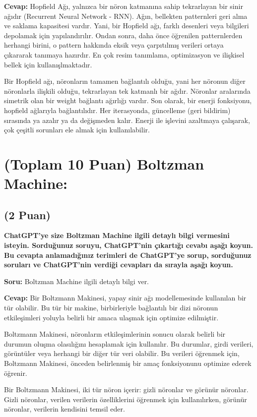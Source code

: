 \documentclass[11pt]{article}
\begin{document}
\textbf{Cevap:} Hopfield Ağı, yalnızca bir nöron katmanına sahip tekrarlayan bir sinir ağıdır (Recurrent Neural Network - RNN). Ağın, bellekten patternleri geri alma ve saklama kapasitesi vardır. Yani, bir Hopfield ağı, farklı desenleri veya bilgileri depolamak için yapılandırılır. Ondan sonra, daha önce öğrenilen patternlerden herhangi birini, o pattern hakkında eksik veya çarpıtılmış verileri ortaya çıkararak tanımaya hazırdır. En çok resim tanımlama, optimizasyon ve ilişkisel bellek için kullanışlmaktadır.

Bir Hopfield ağı, nöronların tamamen bağlantılı olduğu, yani her nöronun diğer nöronlarla ilişkili olduğu, tekrarlayan tek katmanlı bir ağdır. Nöronlar aralarında simetrik olan bir weight bağlantı ağırlığı vardır. Son olarak, bir enerji fonksiyonu, hopfield ağlarıyla bağlantılıdır. Her iterasyonda, güncelleme (geri bildirim) sırasında ya azalır ya da değişmeden kalır.
Enerji ile işlevini azaltmaya çalışarak, çok çeşitli sorunları ele almak için kullanılabilir. 

\section{(Toplam 10 Puan) Boltzman Machine:}

\subsection{(2 Puan)} \textbf{ChatGPT’ye size Boltzman Machine ilgili detaylı bilgi vermesini isteyin. Sorduğunuz soruyu, ChatGPT'nin çıkartığı cevabı aşağı koyun. Bu cevapta anlamadığınız terimleri de ChatGPT’ye sorup, sorduğunuz soruları ve ChatGPT’nin verdiği cevapları da sırayla aşağı koyun.}

 \textbf{Soru:} Boltzman Machine ilgili detaylı bilgi ver.

 \textbf{Cevap:} Bir Boltzmann Makinesi, yapay sinir ağı modellemesinde kullanılan bir tür olabilir. Bu tür bir makine, birbirleriyle bağlantılı bir dizi nöronun etkileşimleri yoluyla belirli bir amaca ulaşmak için optimize edilmiştir.

Boltzmann Makinesi, nöronların etkileşimlerinin sonucu olarak belirli bir durumun oluşma olasılığını hesaplamak için kullanılır. Bu durumlar, girdi verileri, görüntüler veya herhangi bir diğer tür veri olabilir. Bu verileri öğrenmek için, Boltzmann Makinesi, önceden belirlenmiş bir amaç fonksiyonunu optimize ederek öğrenir.

Bir Boltzmann Makinesi, iki tür nöron içerir: gizli nöronlar ve görünür nöronlar. Gizli nöronlar, verilen verilerin özelliklerini öğrenmek için kullanılırken, görünür nöronlar, verilerin kendisini temsil eder.
\end{document}
